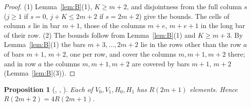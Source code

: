 \documentclass[11pt]{amsart}
\theoremstyle{plain}
\newtheorem{proposition}[theorem]{Proposition}
\theoremstyle{definition}
\begin{document}
\begin{proof}
(1) Lemma~\ref{lem:B}(1), $K\ge m+2$, and disjointness from the full column $s$ ($j\ge1$ if $s=0$, $j+K\le2m+2$ if $s=2m+2$) give the bounds. The cells of column $s$ lie in bar $m+1$, those of the columns $m+e$, $m+e+1$ in the long bar of their row. (2) The bounds follow from Lemma~\ref{lem:B}(1) and $K\ge m+3$. By Lemma~\ref{lem:B}(1) the bars $m+3,\dots,2m+2$ lie in the rows other than the row $a$ of bars $m+1$, $m+2$, one per row, and cover the columns $m,m+1,m+2$ there; and in row $a$ the columns $m,m+1,m+2$ are covered by bars $m+1$, $m+2$ (Lemma~\ref{lem:B}(3)).
\end{proof}

\begin{proposition}[, , ]\label{prop:four}
Each of $V_0,V_1,H_0,H_1$ has $R(2m+1)$ elements. Hence $R(2m+2)=4R(2m+1)$.
\end{proposition}
\end{document}
